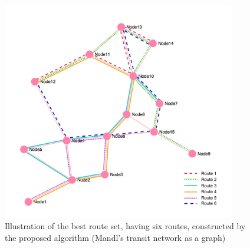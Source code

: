 \begin{figure}[H]
    \begin{center}
    \includegraphics[width=4in]{assets/mandlnetwork_6routes.png}
    \end{center}
    \caption{Illustration of the best route set, having six routes, constructed by the proposed algorithm (Mandl's transit network as a graph)}
    \label{fig:bestRouteSet6} 
\end{figure}

